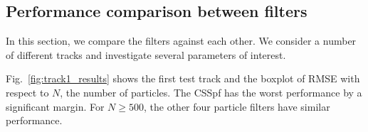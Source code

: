 \documentclass[10pt,letterpaper,final]{article}
\begin{document}
%
%
%

\subsection{Performance comparison between filters}
In this section, we compare the filters against each other. We consider a number of different tracks and investigate several parameters of interest. 

Fig.~\ref{fig:track1_results} shows the first test track and the boxplot of RMSE with respect to $N$, the number of particles. The CSSpf has the worst performance by a significant margin. For $N\geq 500$, the other four particle filters have similar performance. 
\end{document}
